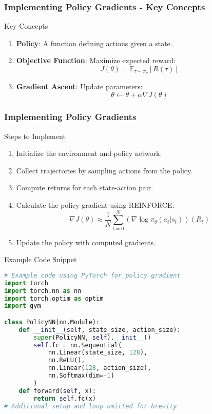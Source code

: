 \documentclass[aspectratio=169]{beamer}
\begin{document}
\begin{frame}[fragile]
    \frametitle{Implementing Policy Gradients - Key Concepts}
    \begin{block}{Key Concepts}
        \begin{enumerate}
            \item \textbf{Policy}: A function defining actions given a state.
            \item \textbf{Objective Function}: Maximize expected reward:
            \begin{equation}
                J(\theta) = \mathbb{E}_{\tau \sim \pi_\theta} \left[ R(\tau) \right]
            \end{equation}
            \item \textbf{Gradient Ascent}: Update parameters:
            \begin{equation}
                \theta \leftarrow \theta + \alpha \nabla J(\theta)
            \end{equation}
        \end{enumerate}
    \end{block}
\end{frame}

\begin{frame}[fragile]
    \frametitle{Implementing Policy Gradients}
    \begin{block}{Steps to Implement}
        \begin{enumerate}
            \item Initialize the environment and policy network.
            \item Collect trajectories by sampling actions from the policy.
            \item Compute returns for each state-action pair.
            \item Calculate the policy gradient using REINFORCE:
            \begin{equation}
                \nabla J(\theta) \approx \frac{1}{N} \sum_{t=0}^{N} (\nabla \log \pi_\theta(a_t | s_t))(R_t)
            \end{equation}
            \item Update the policy with computed gradients.
        \end{enumerate}
    \end{block}
    
    \begin{block}{Example Code Snippet}
    \begin{lstlisting}[language=Python]
# Example code using PyTorch for policy gradient
import torch
import torch.nn as nn
import torch.optim as optim
import gym

class PolicyNN(nn.Module):
    def __init__(self, state_size, action_size):
        super(PolicyNN, self).__init__()
        self.fc = nn.Sequential(
            nn.Linear(state_size, 128),
            nn.ReLU(),
            nn.Linear(128, action_size),
            nn.Softmax(dim=-1)
        )
    def forward(self, x):
        return self.fc(x)
# Additional setup and loop omitted for brevity
    \end{lstlisting}
    \end{block}
\end{frame}
\end{document}
